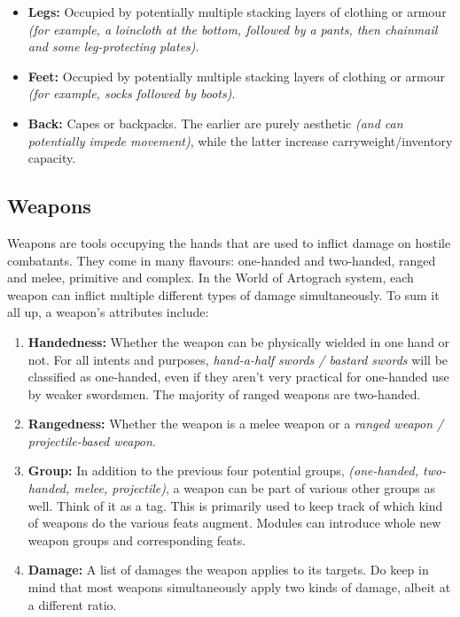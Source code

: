 \documentclass[tikz,openany,11pt,a4paper]{book}
\begin{document}
\begin{itemize}
\item \textbf{Legs:} Occupied by potentially multiple stacking layers of clothing or armour \textit{(for example, a loincloth at the bottom, followed by a pants, then chainmail and some leg-protecting plates)}.
\item \textbf{Feet:} Occupied by potentially multiple stacking layers of clothing or armour \textit{(for example, socks followed by boots)}.
\item \textbf{Back:} Capes or backpacks. The earlier are purely aesthetic \textit{(and can potentially impede movement)}, while the latter increase carryweight/inventory capacity.
\end{itemize}
\subsection{Weapons}
Weapons are tools occupying the hands that are used to inflict damage on hostile combatants. They come in many flavours: one-handed and two-handed, ranged and melee, primitive and complex. In the World of Artograch system, each weapon can inflict multiple different types of damage simultaneously. To sum it all up, a weapon's attributes include:
\begin{enumerate}
  \item \textbf{Handedness:} Whether the weapon can be physically wielded in one hand or not. For all intents and purposes, \textit{hand-a-half swords / bastard swords} will be classified as one-handed, even if they aren't very practical for one-handed use by weaker swordsmen. The majority of ranged weapons are two-handed.
  \item \textbf{Rangedness:} Whether the weapon is a melee weapon or a \textit{ranged weapon / projectile-based weapon}.
  \item \textbf{Group:} In addition to the previous four potential groups, \textit{(one-handed, two-handed, melee, projectile)}, a weapon can be part of various other groups as well. Think of it as a tag. This is primarily used to keep track of which kind of weapons do the various feats augment. Modules can introduce whole new weapon groups and corresponding feats.
  \item \textbf{Damage:} A list of damages the weapon applies to its targets. Do keep in mind that most weapons simultaneously apply two kinds of damage, albeit at a different ratio.
\end{enumerate}
\end{document}
